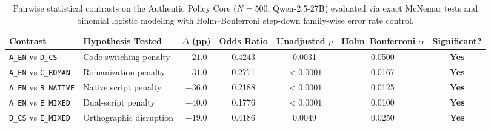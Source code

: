 \begin{table}[t]
\centering
\small
\begin{tabular}{llccccc}
\toprule
\textbf{Contrast} & \textbf{Hypothesis Tested} & $\Delta$ \textbf{(pp)} & \textbf{Odds Ratio} & \textbf{Unadjusted $p$} & \textbf{Holm--Bonferroni $\alpha$} & \textbf{Significant?} \\
\midrule
\texttt{A\_EN} vs \texttt{D\_CS} & Code-switching penalty & $-21.0$ & 0.4243 & 0.0031 & 0.0500 & \textbf{Yes} \\
\texttt{A\_EN} vs \texttt{C\_ROMAN} & Romanization penalty & $-31.0$ & 0.2771 & $< 0.0001$ & 0.0167 & \textbf{Yes} \\
\texttt{A\_EN} vs \texttt{B\_NATIVE} & Native script penalty & $-36.0$ & 0.2188 & $< 0.0001$ & 0.0125 & \textbf{Yes} \\
\texttt{A\_EN} vs \texttt{E\_MIXED} & Dual-script penalty & $-40.0$ & 0.1776 & $< 0.0001$ & 0.0100 & \textbf{Yes} \\
\texttt{D\_CS} vs \texttt{E\_MIXED} & Orthographic disruption & $-19.0$ & 0.4186 & 0.0049 & 0.0250 & \textbf{Yes} \\
\bottomrule
\end{tabular}
\caption{Pairwise statistical contrasts on the Authentic Policy Core ($N=500$, Qwen-2.5-27B) evaluated via exact McNemar tests and binomial logistic modeling with Holm--Bonferroni step-down family-wise error rate control.}
\label{tab:pairwise_contrasts}
\end{table}
